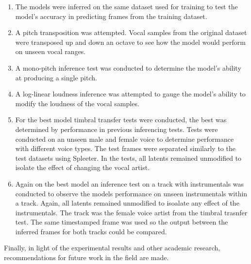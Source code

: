 \begin{enumerate}
    \item The models were inferred on the same dataset used for training to test the model's accuracy in predicting frames from the training dataset.
    \item A pitch transposition was attempted. Vocal samples from the original dataset were transposed up and down an octave to see how the model would perform on unseen vocal ranges.
    \item A mono-pitch inference test was conducted to determine the model's ability at producing a single pitch.
    \item A log-linear loudness inference was attempted to gauge the model's ability to modify the loudness of the vocal samples.
    \item For the best model timbral transfer tests were conducted, the best was determined by performance in previous inferencing tests. Tests were conducted on an unseen male and female voice to determine performance with different voice types. The test frames were separated similarly to the test datasets using Spleeter. In the tests, all latents remained unmodified to isolate the effect of changing the vocal artist.
    \item Again on the best model an inference test on a track with instrumentals was conducted to observe the models performance on unseen instrumentals within a track. Again, all latents remained unmodified to isoalate any effect of the instrumentals. The track was the female voice artist from the timbral trasnfer test. The same timestamped frame was used so the output between the inferred frames for both tracks could be compared.
\end{enumerate}

Finally, in light of the experimental results and other academic research, recommendations for future work in the field are made.
